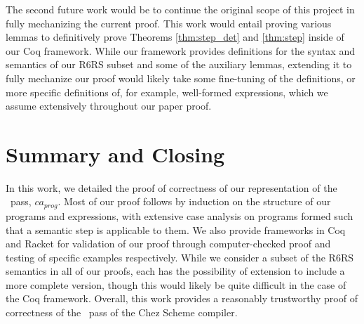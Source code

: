 The second future work would be to continue the original scope of this project in fully mechanizing the current proof. This work would entail proving various lemmas to definitively prove Theorems \ref{thm:step_det} and \ref{thm:step} inside of our Coq framework. While our framework provides definitions for the syntax and semantics of our R6RS subset and some of the auxiliary lemmas, extending it to fully mechanize our proof would likely take some fine-tuning of the definitions, or more specific definitions of, for example, well-formed expressions, which we assume extensively throughout our paper proof.

\section{Summary and Closing}
In this work, we detailed the proof of correctness of our representation of the \caname\ pass, $ca_{prog}$. Most of our proof follows by induction on the structure of our programs and expressions, with extensive case analysis on programs formed such that a semantic step is applicable to them. We also provide frameworks in Coq and Racket for validation of our proof through computer-checked proof and testing of specific examples respectively. While we consider a subset of the R6RS semantics in all of our proofs, each has the possibility of extension to include a more complete version, though this would likely be quite difficult in the case of the Coq framework. Overall, this work provides a reasonably trustworthy proof of correctness of the \caname\ pass of the Chez Scheme compiler.